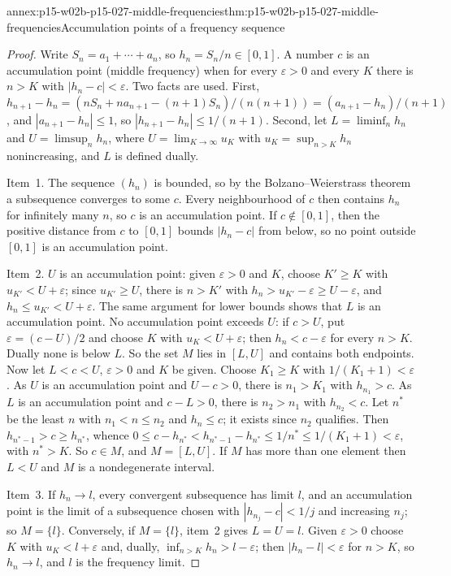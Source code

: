 \begin{annexitem}{annex:p15-w02b-p15-027-middle-frequencies}{thm:p15-w02b-p15-027-middle-frequencies}{Accumulation points of a frequency sequence}
\begin{proof}
Write \(S_n=a_1+\cdots+a_n\), so \(h_n=S_n/n\in[0,1]\). A number \(c\)
is an accumulation point (middle frequency) when for every
\(\varepsilon>0\) and every \(K\) there is \(n>K\) with
\(|h_n-c|<\varepsilon\). Two facts are used.
First, \(h_{n+1}-h_n=(nS_n+na_{n+1}-(n+1)S_n)/(n(n+1))=(a_{n+1}-h_n)/(n+1)\),
and \(|a_{n+1}-h_n|\leq1\), so \(|h_{n+1}-h_n|\leq1/(n+1)\).
Second, let \(L=\liminf_nh_n\) and \(U=\limsup_nh_n\), where
\(U=\lim_{K\to\infty}u_K\) with \(u_K=\sup_{n>K}h_n\) nonincreasing, and
\(L\) is defined dually.

Item~1. The sequence \((h_n)\) is bounded, so by the Bolzano--Weierstrass
theorem a subsequence converges to some \(c\). Every neighbourhood of
\(c\) then contains \(h_n\) for infinitely many \(n\), so \(c\) is an
accumulation point. If \(c\notin[0,1]\), then the positive distance from
\(c\) to \([0,1]\) bounds \(|h_n-c|\) from below, so no point outside
\([0,1]\) is an accumulation point.

Item~2. \(U\) is an accumulation point: given \(\varepsilon>0\) and \(K\),
choose \(K'\geq K\) with \(u_{K'}<U+\varepsilon\); since
\(u_{K'}\geq U\), there is \(n>K'\) with \(h_n>u_{K'}-\varepsilon\geq U-\varepsilon\),
and \(h_n\leq u_{K'}<U+\varepsilon\). The same argument for lower bounds
shows that \(L\) is an accumulation point. No accumulation point exceeds
\(U\): if \(c>U\), put \(\varepsilon=(c-U)/2\) and choose \(K\) with
\(u_K<U+\varepsilon\); then \(h_n<c-\varepsilon\) for every \(n>K\).
Dually none is below \(L\). So the set \(M\) lies in \([L,U]\) and
contains both endpoints.
Now let \(L<c<U\), \(\varepsilon>0\) and \(K\) be given. Choose
\(K_1\geq K\) with \(1/(K_1+1)<\varepsilon\). As \(U\) is an
accumulation point and \(U-c>0\), there is \(n_1>K_1\) with
\(h_{n_1}>c\). As \(L\) is an accumulation point and \(c-L>0\), there is
\(n_2>n_1\) with \(h_{n_2}<c\). Let \(n^*\) be the least \(n\) with
\(n_1<n\leq n_2\) and \(h_n\leq c\); it exists since \(n_2\) qualifies.
Then \(h_{n^*-1}>c\geq h_{n^*}\), whence
\(0\leq c-h_{n^*}<h_{n^*-1}-h_{n^*}\leq1/n^*\leq1/(K_1+1)<\varepsilon\),
with \(n^*>K\). So \(c\in M\), and \(M=[L,U]\). If \(M\) has more than one
element then \(L<U\) and \(M\) is a nondegenerate interval.

Item~3. If \(h_n\to l\), every convergent subsequence has limit \(l\),
and an accumulation point is the limit of a subsequence chosen with
\(|h_{n_j}-c|<1/j\) and increasing \(n_j\); so \(M=\{l\}\). Conversely,
if \(M=\{l\}\), item~2 gives \(L=U=l\). Given \(\varepsilon>0\) choose
\(K\) with \(u_K<l+\varepsilon\) and, dually,
\(\inf_{n>K}h_n>l-\varepsilon\); then \(|h_n-l|<\varepsilon\) for
\(n>K\), so \(h_n\to l\), and \(l\) is the frequency limit.
\end{proof}
\end{annexitem}

